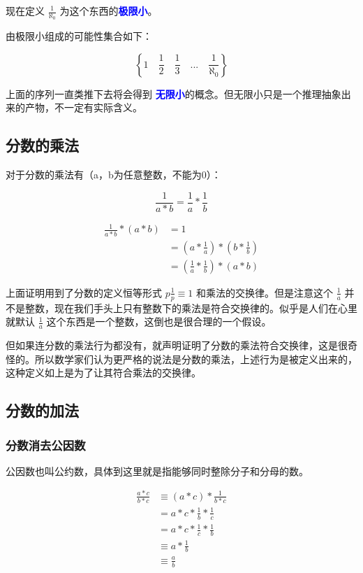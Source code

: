 \documentclass[12pt,oneside]{book}
\renewcommand{\emph}[1]{\textcolor{blue}{\textbf{#1}}}
\begin{document}
现在定义 $\frac{1}{\aleph_0}$ 为这个东西的\emph{极限小}。

由极限小组成的可能性集合如下：

\[
\left\{1 \quad \frac{1}{2} \quad \frac{1}{3} \quad  ...  \quad \frac{1}{\aleph_0} \right\}
\]


上面的序列一直类推下去将会得到 \emph{无限小}的概念。但无限小只是一个推理抽象出来的产物，不一定有实际含义。

\subsection{分数的乘法}
对于分数的乘法有（a，b为任意整数，不能为0）：

\begin{equation}
\label{eq:17}
\frac{1}{a*b} = \frac{1}{a} * \frac{1}{b}
\end{equation}

\begin{align*}
\frac{1}{a*b} * (a*b) &=1\\
&= (a*\frac{1}{a}) * (b * \frac{1}{b})\\
&=(\frac{1}{a} * \frac{1}{b}) * (a*b)
\end{align*}

上面证明用到了分数的定义恒等形式 $p\frac{1}{p} \equiv 1$ 和乘法的交换律。但是注意这个 $\frac{1}{a}$ 并不是整数，现在我们手头上只有整数下的乘法是符合交换律的。似乎是人们在心里就默认 $\frac{1}{a}$ 这个东西是一个整数，这倒也是很合理的一个假设。

但如果连分数的乘法行为都没有，就声明证明了分数的乘法符合交换律，这是很奇怪的。所以数学家们认为更严格的说法是分数的乘法，上述行为是被定义出来的，这种定义如上是为了让其符合乘法的交换律。


\subsection{分数的加法}
\subsubsection{分数消去公因数}
公因数也叫公约数，具体到这里就是指能够同时整除分子和分母的数。

\begin{align*}
\frac{a*c}{b*c} &\equiv (a * c) * \frac{1}{b*c}\\
&=a * c * \frac{1}{b} * \frac{1}{c}\\
&=a*c*\frac{1}{c}*\frac{1}{b}\\
&\equiv a*\frac{1}{b}\\
&\equiv \frac{a}{b}
\end{align*}
\end{document}
